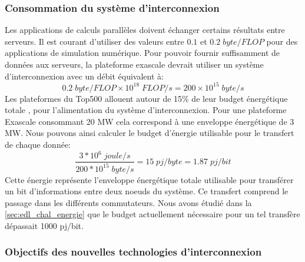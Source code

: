     
    \subsubsection{Consommation du système d'interconnexion} 
        
        Les applications de calculs parallèles doivent échanger certains résultats entre serveurs. Il est courant d'utiliser des valeurs entre $0.1$ et $0.2 \; byte/FLOP$ \cite{Bergman2015} pour des applications de simulation numérique. Pour pouvoir fournir suffisamment de données aux serveurs, la plateforme exascale devrait utiliser un système d'interconnexion avec un débit équivalent à:
        \begin{equation}
            0.2 \; byte/FLOP \times 10^{18} \; FLOP/s = 200 \times 10^{15} \; byte/s
        \end{equation}
        Les plateformes du Top500 allouent autour de 15\% de leur budget énergétique totale \cite{bergman2008exascale}, pour l'alimentation du système d'interconnexion. Pour une plateforme Exascale consommant 20 MW cela correspond à une enveloppe énergétique de 3 MW. Nous pouvons ainsi calculer le budget d'énergie utilisable pour le transfert de chaque donnée:
        \begin{equation}
            \frac{3 * 10^6 \; joule/s}{200 * 10^{15} \; byte/s} = 15 \; pj/byte = 1.87 \; pj/bit
        \end{equation}
        Cette énergie représente l'enveloppe énergétique totale utilisable pour transférer un bit d'informations entre deux noeuds du système. Ce transfert comprend le passage dans les différents commutateurs. Nous avons étudié dans la \autoref{sec:edl_chal_energie} que le budget actuellement nécessaire pour un tel transfère dépassait 1000 pj/bit.
    
    
    \subsubsection{Objectifs des nouvelles technologies d'interconnexion} 
        

